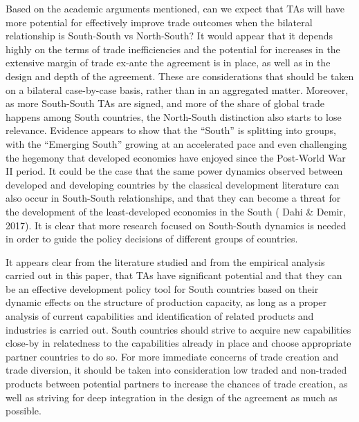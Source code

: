 \documentclass[12pt]{article}%
\begin{document}
Based on the academic arguments mentioned, can we expect that TAs will
have more potential for effectively improve trade outcomes when the
bilateral relationship is South-South vs North-South? It would appear
that it depends highly on the terms of trade inefficiencies and the
potential for increases in the extensive margin of trade ex-ante the
agreement is in place, as well as in the design and depth of the
agreement. These are considerations that should be taken on a bilateral
case-by-case basis, rather than in an aggregated matter. Moreover, as more
South-South TAs are signed, and more of the share of global trade
happens among South countries, the North-South distinction also starts
to lose relevance. Evidence appears to show that the ``South'' is
splitting into groups, with the ``Emerging South'' growing at an
accelerated pace and even challenging the hegemony that developed
economies have enjoyed since the Post-World War II period. It could be
the case that the same power dynamics observed between developed and
developing countries by the classical development literature can also occur
in South-South relationships, and that they can become a threat for the
development of the least-developed economies in the South (\cite{dahi_south-south_2017} Dahi \&
Demir, 2017). It is clear that more research focused on South-South
dynamics is needed in order to guide the policy decisions of different
groups of countries.

It appears clear from the literature studied and from the empirical
analysis carried out in this paper, that TAs have significant potential
and that they can be an effective development policy tool for South
countries based on their dynamic effects on the structure of production
capacity, as long as a proper analysis of current capabilities and
identification of related products and industries is carried out. South
countries should strive to acquire new capabilities close-by in
relatedness to the capabilities already in place and choose appropriate
partner countries to do so. For more immediate concerns of trade
creation and trade diversion, it should be taken into consideration low
traded and non-traded products between potential partners to increase
the chances of trade creation, as well as striving for deep integration
in the design of the agreement as much as possible.

%
\end{document}
